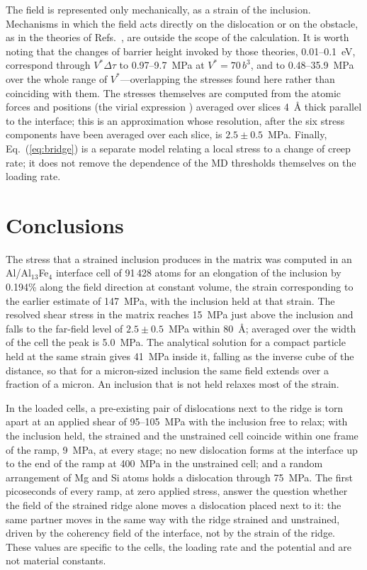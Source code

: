 The field is represented only mechanically, as a strain of the inclusion.
Mechanisms in which the field acts directly on the dislocation or on the
obstacle, as in the theories of Refs.~\cite{Alshits2003,Molotskii2000}, are
outside the scope of the calculation. It is worth noting that the changes of
barrier height invoked by those theories, 0.01--0.1~eV, correspond through
$V^{*}\Delta\tau$ to 0.97--9.7~MPa at $V^{*}=70\,b^{3}$, and to
0.48--35.9~MPa over the whole range of $V^{*}$---overlapping the stresses
found here rather than coinciding with them. The stresses themselves are
computed from the atomic forces and positions (the virial expression
\cite{Thompson2022LAMMPS}) averaged over slices 4~\AA{} thick parallel to the
interface; this is an approximation whose resolution, after the six stress
components have been averaged over each slice, is $2.5\pm0.5$~MPa. Finally,
Eq.~(\ref{eq:bridge}) is a separate model relating a local stress to a change
of creep rate; it does not remove the dependence of the MD thresholds
themselves on the loading rate.

\section{Conclusions}
\label{sec:conclusions}

The stress that a strained inclusion produces in the matrix was computed in
an Al/Al$_{13}$Fe$_4$ interface cell of 91\,428 atoms for an elongation of
the inclusion by 0.194\% along the field direction at constant volume, the
strain corresponding to the earlier estimate of 147~MPa, with the inclusion
held at that strain. The resolved shear stress in the matrix reaches
15~MPa just above the inclusion and falls to the far-field level
of $2.5\pm0.5$~MPa within 80~\AA{}; averaged over the width of the cell the
peak is 5.0~MPa. The analytical solution for a compact particle
held at the same strain gives 41~MPa inside it, falling as the inverse
cube of the distance, so that for a micron-sized inclusion the same field
extends over a fraction of a micron. An inclusion that is not held relaxes
most of the strain.

In the loaded cells, a pre-existing pair of dislocations next to the ridge
is torn apart at an applied shear of 95--105~MPa with the inclusion free to relax; with the inclusion held, the strained and the unstrained cell coincide within one frame of the ramp, 9~MPa, at every stage; no new dislocation forms at the interface up to the end of the ramp at 400~MPa in the unstrained cell; and a random
arrangement of Mg and Si atoms holds a dislocation through 75~MPa. The first picoseconds of every ramp, at zero applied stress, answer the question whether the field of the strained ridge alone moves a dislocation placed next to it: the same partner moves in the same way with the ridge strained and unstrained, driven by the coherency field of the interface, not by the strain of the ridge.
These values are specific to the cells, the loading rate and the potential
and are not material constants.

